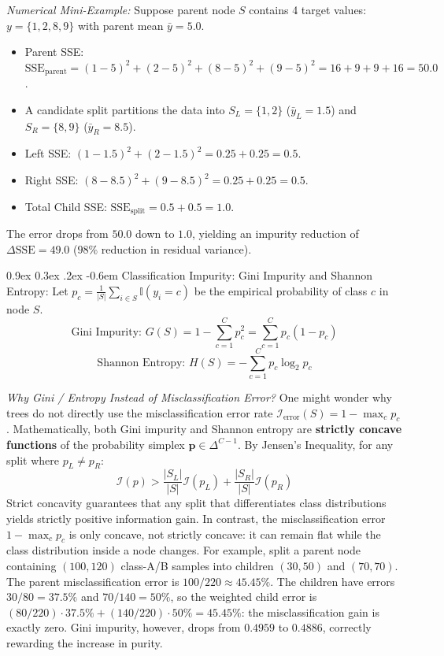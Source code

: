 \documentclass[11pt,a4paper]{article}
\makeatletter
\renewcommand\paragraph{\@startsection{paragraph}{4}{\z@}%
                                     {0.9ex \@plus0.3ex \@minus.2ex}%
                                     {-0.6em}%
                                     {\normalfont\normalsize\bfseries}}
\makeatother
\begin{document}
\emph{Numerical Mini-Example:} Suppose parent node $S$ contains 4 target values: $y = \{1, 2, 8, 9\}$ with parent mean $\bar{y} = 5.0$.
\begin{itemize}
    \item Parent SSE: $\text{SSE}_{\text{parent}} = (1-5)^2 + (2-5)^2 + (8-5)^2 + (9-5)^2 = 16 + 9 + 9 + 16 = 50.0$.
    \item A candidate split partitions the data into $S_L = \{1, 2\}$ ($\bar{y}_L = 1.5$) and $S_R = \{8, 9\}$ ($\bar{y}_R = 8.5$).
    \item Left SSE: $(1-1.5)^2 + (2-1.5)^2 = 0.25 + 0.25 = 0.5$.
    \item Right SSE: $(8-8.5)^2 + (9-8.5)^2 = 0.25 + 0.25 = 0.5$.
    \item Total Child SSE: $\text{SSE}_{\text{split}} = 0.5 + 0.5 = 1.0$.
\end{itemize}
The error drops from $50.0$ down to $1.0$, yielding an impurity reduction of $\Delta \text{SSE} = 49.0$ ($98\%$ reduction in residual variance).

\paragraph{Classification Impurity: Gini Impurity and Shannon Entropy:}
Let $p_c = \frac{1}{|S|} \sum_{i \in S} \mathbb{I}(y_i = c)$ be the empirical probability of class $c$ in node $S$.
\begin{equation}
    \text{Gini Impurity: } G(S) = 1 - \sum_{c=1}^C p_c^2 = \sum_{c=1}^C p_c (1 - p_c)
\end{equation}
\begin{equation}
    \text{Shannon Entropy: } H(S) = -\sum_{c=1}^C p_c \log_2 p_c
\end{equation}

\emph{Why Gini / Entropy Instead of Misclassification Error?}
One might wonder why trees do not directly use the misclassification error rate $\mathcal{I}_{\text{error}}(S) = 1 - \max_c p_c$. 
Mathematically, both Gini impurity and Shannon entropy are \textbf{strictly concave functions} of the probability simplex $\mathbf{p} \in \Delta^{C-1}$. By Jensen's Inequality, for any split where $p_L \neq p_R$:
\begin{equation}
    \mathcal{I}(p) > \frac{|S_L|}{|S|}\mathcal{I}(p_L) + \frac{|S_R|}{|S|}\mathcal{I}(p_R)
\end{equation}
Strict concavity guarantees that any split that differentiates class distributions yields strictly positive information gain. In contrast, the misclassification error $1 - \max_c p_c$ is only concave, not strictly concave: it can remain flat while the class distribution inside a node changes. For example, split a parent node containing $(100, 120)$ class-A/B samples into children $(30, 50)$ and $(70, 70)$. The parent misclassification error is $100/220 \approx 45.45\%$. The children have errors $30/80 = 37.5\%$ and $70/140 = 50\%$, so the weighted child error is $(80/220)\cdot 37.5\% + (140/220)\cdot 50\% = 45.45\%$: the misclassification gain is exactly zero. Gini impurity, however, drops from $0.4959$ to $0.4886$, correctly rewarding the increase in purity.
\end{document}

